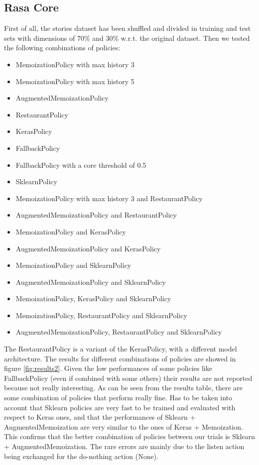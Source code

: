 \documentclass[11pt,a4paper]{article}
\begin{document}
\subsection{Rasa Core}

First of all, the stories dataset has been shuffled and divided in training and test sets with dimensions of 70\% and 30\% w.r.t. the original dataset. Then we tested the following combinations of policies:

\begin{itemize}
\item MemoizationPolicy with max history 3
\item MemoizationPolicy with max history 5
\item AugmentedMemoizationPolicy
\item RestaurantPolicy
\item KerasPolicy
\item FallbackPolicy
\item FallbackPolicy with a core threshold of 0.5
\item SklearnPolicy
\item MemoizationPolicy with max history 3 and RestaurantPolicy
\item AugmentedMemoizationPolicy and RestaurantPolicy
\item MemoizationPolicy and KerasPolicy
\item AugmentedMemoizationPolicy and KerasPolicy
\item MemoizationPolicy and SklearnPolicy
\item AugmentedMemoizationPolicy and SklearnPolicy
\item MemoizationPolicy, KerasPolicy and SklearnPolicy
\item MemoizationPolicy, RestaurantPolicy and SklearnPolicy
\item AugmentedMemoizationPolicy, RestaurantPolicy and SklearnPolicy
\end{itemize}

The RestaurantPolicy is a variant of the KerasPolicy, with a different model architecture. The results for different combinations of policies are showed in figure \ref{fig:results2}. Given the low performances of some policies like FallbackPolicy (even if combined with some others) their results are not reported because not really interesting. As can be seen from the results table, there are some combination of policies that perform really fine. Has to be taken into account that Sklearn policies are very fast to be trained and evaluated with respect to Keras ones, and that the performances of Sklearn + AugmentedMemoization are very similar to the ones of Keras + Memoization. This confirms that the better combination of policies between our trials is Sklearn + AugmentedMemoization. The rare errors are mainly due to the listen action being exchanged for the do-nothing action (None).
\end{document}
